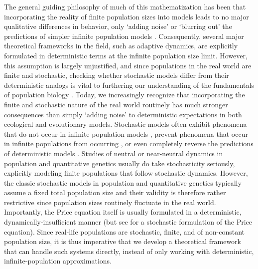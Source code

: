 The general guiding philosophy of much of this mathematization has been that incorporating the reality of finite population sizes into models leads to no major qualitative differences in behavior, only `adding noise' or `blurring out' the predictions of simpler infinite population models \citep{page_unifying_2002}. Consequently, several major theoretical frameworks in the field, such as adaptive dynamics, are explicitly formulated in deterministic terms at the infinite population size limit. However, this assumption is largely unjustified, and since populations in the real world are finite and stochastic, checking whether stochastic models differ from their deterministic analogs is vital to furthering our understanding of the fundamentals of population biology \citep{hastings_transients_2004, coulson_skeletons_2004, shoemaker_integrating_2020}. Today, we increasingly recognize that incorporating the finite and stochastic nature of the real world routinely has much stronger consequences than simply `adding noise' to deterministic expectations \citep{boettiger_noise_2018} in both ecological \citep{schreiber_does_2022} and evolutionary \citep{delong_stochasticity_2023} models. Stochastic models often exhibit phenomena that do not occur in infinite-population models \citep{rogers_demographic_2012, rogers_spontaneous_2012, veller_drift-induced_2017}, prevent phenomena that occur in infinite populations from occurring \citep{proulx_what_2005, johansson_will_2006, claessen_delayed_2007,  wakano_evolutionary_2013, debarre_evolutionary_2016, johnson_two-dimensional_2021}, or even completely reverse the predictions of deterministic models \citep{houchmandzadeh_selection_2012,houchmandzadeh_fluctuation_2015,constable_demographic_2016,mcleod_social_2019}. Studies of neutral or near-neutral dynamics in population and quantitative genetics usually do take stochasticity seriously, explicitly modeling finite populations that follow stochastic dynamics. However, the classic stochastic models in population and quantitative genetics typically assume a fixed total population size \citep{fisher_genetical_1930, crow_introduction_1970, lande_natural_1976} and their validity is therefore rather restrictive since population sizes routinely fluctuate in the real world. Importantly, the Price equation itself is usually formulated in a deterministic, dynamically-insufficient manner (but see \cite{rice_stochastic_2008} for a stochastic formulation of the Price equation). Since real-life populations are stochastic, finite, and of non-constant population size, it is thus imperative that we develop a theoretical framework that can handle such systems directly, instead of only working with deterministic, infinite-population approximations.\\
